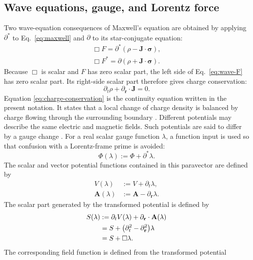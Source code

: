 \documentclass[10pt,letterpaper]{article}
\newcommand{\pv}[1]{#1}
\newcommand{\vct}[1]{\mathbf{#1}}
\newcommand{\sigv}{\vct{\pv{\bm{\sigma}}}}
\newcommand{\delop}{\partial}
\newcommand{\delr}{\delop_{\vct{r}}}
\newcommand{\gradv}{\delr}
\newcommand{\conj}[1]{#1^{*}}
\begin{document}
\subsection{Wave equations, gauge, and Lorentz force}
Two wave-equation consequences of Maxwell's equation are obtained by
applying \(\conj{\pv{\partial}}\) to Eq.\ \eqref{eq:maxwell} and
\(\pv{\partial}\) to its star-conjugate equation:
\begin{align}
\Box\pv{F}=\conj{\pv{\partial}}(\rho-\vct{J}\cdot\sigv),
\label{eq:wave-F}
\\
\Box\conj{\pv{F}}
=\pv{\partial}(\rho+\vct{J}\cdot\sigv).
\label{eq:wave-F-conjugate}
\end{align}
Because \(\Box\) is scalar and \(\pv{F}\) has zero scalar part, the left side
of Eq.\ \eqref{eq:wave-F} has zero scalar part. Its right-side scalar part
therefore gives charge conservation:
\begin{equation}
\partial_t\rho+\gradv\cdot\vct{J}=0.
\label{eq:charge-conservation}
\end{equation}
Equation \eqref{eq:charge-conservation} is the continuity equation written in the present notation.
It states that a local change of charge density is balanced by charge flowing
through the surrounding boundary \cite{jackson1998}.
Different potentials may describe the same electric and magnetic fields.
Such potentials are said to differ by a gauge change
\cite{jackson1998}. For a real scalar gauge function \(\lambda\), a function
input is used so that confusion with a Lorentz-frame prime is avoided:
\begin{equation}
\pv{\Phi}(\lambda):=\pv{\Phi}+\conj{\pv{\partial}}\lambda.
\label{eq:gauge}
\end{equation}
The scalar and vector potential functions contained in this paravector are
defined by
\begin{align}
V(\lambda)&:=V+\partial_t\lambda,
\label{eq:gauge-scalar-potential}\\
\vct{A}(\lambda)&:=\vct{A}-\gradv\lambda.
\label{eq:gauge-vector-potential}
\end{align}
The scalar part generated by the transformed potential is defined by
\begin{align}
S(\lambda)
&:=\partial_tV(\lambda)+\gradv\cdot\vct{A}(\lambda)\notag\\
&=S+\bigl(\partial_t^2-\gradv^2\bigr)\lambda\notag\\
&=S+\Box\lambda.
\label{eq:gauge-scalar-part}
\end{align}
The corresponding field function is defined from the transformed potential
\end{document}
